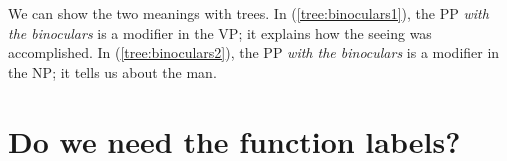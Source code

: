 We can show the two meanings with trees. In (\ref{tree:binoculars1}), the PP \textit{with the binoculars} is a modifier in the VP; it explains how the seeing was accomplished. In (\ref{tree:binoculars2}), the PP \textit{with the binoculars} is a modifier in the NP; it tells us about the man.

\ea
    \ea {} \label{tree:binoculars1}
    \ex {} \label{tree:binoculars2}
    \z
\z
{}

\section{Do we need the function labels?}


